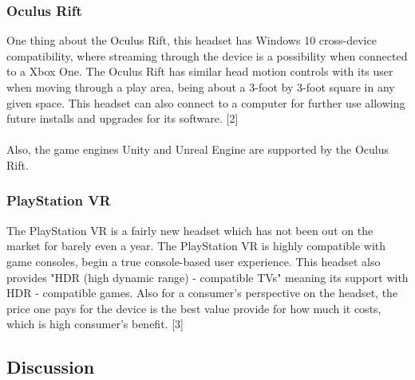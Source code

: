 \documentclass[letterpaper,10pt,onecolumn,compsoc]{IEEEtran}
\begin{document}
\subsubsection{Oculus Rift}


\noindent
One thing about the Oculus Rift, this headset has Windows 10 cross-device compatibility, where streaming through the device is a possibility when connected to a Xbox One. The Oculus Rift has similar head motion controls with its user when moving through a play area, being about a 3-foot by 3-foot square in any given space. This headset can also connect to a computer for further use allowing future installs and upgrades for its software. [2]
\\ ~ \\
Also, the game engines Unity and Unreal Engine are supported by the Oculus Rift.

\subsubsection{PlayStation VR}


\noindent
The PlayStation VR is a fairly new headset which has not been out on the market for barely even a year. The PlayStation VR is highly compatible with game consoles, begin a true console-based user experience. This headset also provides "HDR (high dynamic range) - compatible TVs" meaning its support  with HDR - compatible games. Also for a consumer's perspective on the headset, the price one pays for the device is the best value provide for how much it costs, which is high consumer's benefit. [3]

\subsection{Discussion}

\iffalse
\noindent\leavevmode\rlap{\textbf{0,0}}\hfill{\textbf{0,1}}\hfill\llap{\textbf{0,2}}\par

\noindent\leavevmode\rlap{\textbf{1,0}}\hfill{\textbf{1,1}}\hfill\llap{\textbf{1,2}}\par

\noindent\leavevmode\rlap{\textbf{2,0}}\hfill{\textbf{2,1}}\hfill\llap{\textbf{2,2}}\par
\fi
\end{document}
